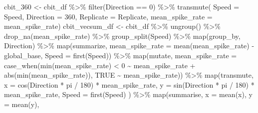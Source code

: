 \documentclass[
]{book}
\newenvironment{Shaded}{\begin{snugshade}}{\end{snugshade}}
\newcommand{\AttributeTok}[1]{\textcolor[rgb]{0.77,0.63,0.00}{#1}}
\newcommand{\ConstantTok}[1]{\textcolor[rgb]{0.00,0.00,0.00}{#1}}
\newcommand{\DecValTok}[1]{\textcolor[rgb]{0.00,0.00,0.81}{#1}}
\newcommand{\FunctionTok}[1]{\textcolor[rgb]{0.00,0.00,0.00}{#1}}
\newcommand{\NormalTok}[1]{#1}
\newcommand{\OtherTok}[1]{\textcolor[rgb]{0.56,0.35,0.01}{#1}}
\newcommand{\SpecialCharTok}[1]{\textcolor[rgb]{0.00,0.00,0.00}{#1}}
\begin{document}
\begin{Shaded}
\begin{Highlighting}[]
\NormalTok{cbit\_360 }\OtherTok{\textless{}{-}}
\NormalTok{  cbit\_df }\SpecialCharTok{\%\textgreater{}\%}
  \FunctionTok{filter}\NormalTok{(Direction }\SpecialCharTok{==} \DecValTok{0}\NormalTok{) }\SpecialCharTok{\%\textgreater{}\%}
  \FunctionTok{transmute}\NormalTok{(}
    \AttributeTok{Speed =}\NormalTok{ Speed,}
    \AttributeTok{Direction =} \DecValTok{360}\NormalTok{,}
    \AttributeTok{Replicate =}\NormalTok{ Replicate,}
    \AttributeTok{mean\_spike\_rate =}\NormalTok{ mean\_spike\_rate)}
\NormalTok{cbit\_vecsum\_df }\OtherTok{\textless{}{-}}
\NormalTok{  cbit\_df }\SpecialCharTok{\%\textgreater{}\%}
  \FunctionTok{ungroup}\NormalTok{() }\SpecialCharTok{\%\textgreater{}\%}
  \FunctionTok{drop\_na}\NormalTok{(mean\_spike\_rate) }\SpecialCharTok{\%\textgreater{}\%}
  \FunctionTok{group\_split}\NormalTok{(Speed) }\SpecialCharTok{\%\textgreater{}\%}
  \FunctionTok{map}\NormalTok{(group\_by, Direction) }\SpecialCharTok{\%\textgreater{}\%}
  \FunctionTok{map}\NormalTok{(summarize,}
      \AttributeTok{mean\_spike\_rate =} \FunctionTok{mean}\NormalTok{(mean\_spike\_rate) }\SpecialCharTok{{-}}\NormalTok{ global\_base,}
      \AttributeTok{Speed =} \FunctionTok{first}\NormalTok{(Speed)) }\SpecialCharTok{\%\textgreater{}\%}
  \FunctionTok{map}\NormalTok{(mutate,}
      \AttributeTok{mean\_spike\_rate =}
        \FunctionTok{case\_when}\NormalTok{(}\FunctionTok{min}\NormalTok{(mean\_spike\_rate) }\SpecialCharTok{\textless{}} \DecValTok{0} \SpecialCharTok{\textasciitilde{}}\NormalTok{ mean\_spike\_rate }\SpecialCharTok{+} \FunctionTok{abs}\NormalTok{(}\FunctionTok{min}\NormalTok{(mean\_spike\_rate)),}
                  \ConstantTok{TRUE} \SpecialCharTok{\textasciitilde{}}\NormalTok{ mean\_spike\_rate)) }\SpecialCharTok{\%\textgreater{}\%}
  \FunctionTok{map}\NormalTok{(transmute,}
      \AttributeTok{x =} \FunctionTok{cos}\NormalTok{(Direction }\SpecialCharTok{*}\NormalTok{ pi }\SpecialCharTok{/} \DecValTok{180}\NormalTok{) }\SpecialCharTok{*}\NormalTok{ mean\_spike\_rate,}
      \AttributeTok{y =} \FunctionTok{sin}\NormalTok{(Direction }\SpecialCharTok{*}\NormalTok{ pi }\SpecialCharTok{/} \DecValTok{180}\NormalTok{) }\SpecialCharTok{*}\NormalTok{ mean\_spike\_rate,}
      \AttributeTok{Speed =} \FunctionTok{first}\NormalTok{(Speed)}
\NormalTok{  ) }\SpecialCharTok{\%\textgreater{}\%}
  \FunctionTok{map}\NormalTok{(summarise,}
      \AttributeTok{x =} \FunctionTok{mean}\NormalTok{(x),}
      \AttributeTok{y =} \FunctionTok{mean}\NormalTok{(y),}

\end{Highlighting}
\end{Shaded}
\end{document}
